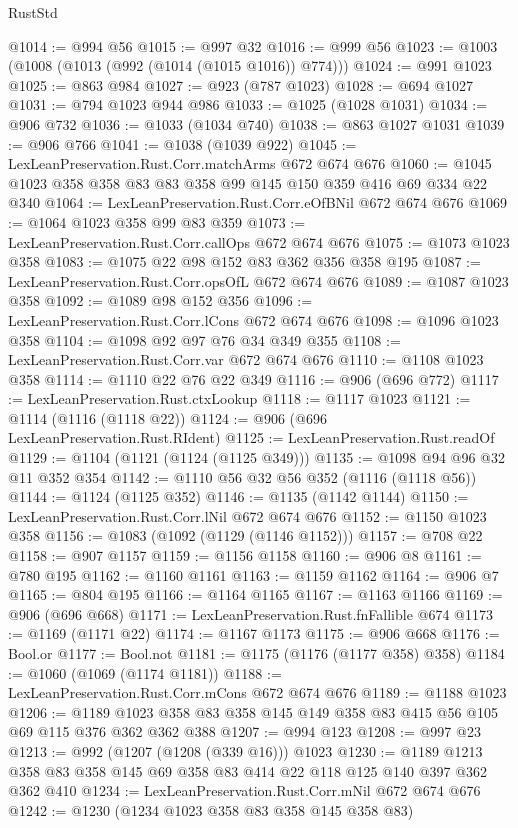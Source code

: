 \begin{lexlean}{RustStd}
\begin{coremodule}
@1014 := @994 @56
@1015 := @997 @32
@1016 := @999 @56
@1023 := @1003 (@1008 (@1013 (@992 (@1014 (@1015 @1016)) @774)))
@1024 := @991 @1023
@1025 := @863 @984
@1027 := @923 (@787 @1023)
@1028 := @694 @1027
@1031 := @794 @1023 @944 @986
@1033 := @1025 (@1028 @1031)
@1034 := @906 @732
@1036 := @1033 (@1034 @740)
@1038 := @863 @1027 @1031
@1039 := @906 @766
@1041 := @1038 (@1039 @922)
@1045 := LexLeanPreservation.Rust.Corr.matchArms @672 @674 @676
@1060 := @1045 @1023 @358 @358 @83 @83 @358 @99 @145 @150 @359 @416 @69 @334 @22 @340
@1064 := LexLeanPreservation.Rust.Corr.eOfBNil @672 @674 @676
@1069 := @1064 @1023 @358 @99 @83 @359
@1073 := LexLeanPreservation.Rust.Corr.callOps @672 @674 @676
@1075 := @1073 @1023 @358
@1083 := @1075 @22 @98 @152 @83 @362 @356 @358 @195
@1087 := LexLeanPreservation.Rust.Corr.opsOfL @672 @674 @676
@1089 := @1087 @1023 @358
@1092 := @1089 @98 @152 @356
@1096 := LexLeanPreservation.Rust.Corr.lCons @672 @674 @676
@1098 := @1096 @1023 @358
@1104 := @1098 @92 @97 @76 @34 @349 @355
@1108 := LexLeanPreservation.Rust.Corr.var @672 @674 @676
@1110 := @1108 @1023 @358
@1114 := @1110 @22 @76 @22 @349
@1116 := @906 (@696 @772)
@1117 := LexLeanPreservation.Rust.ctxLookup
@1118 := @1117 @1023
@1121 := @1114 (@1116 (@1118 @22))
@1124 := @906 (@696 LexLeanPreservation.Rust.RIdent)
@1125 := LexLeanPreservation.Rust.readOf
@1129 := @1104 (@1121 (@1124 (@1125 @349)))
@1135 := @1098 @94 @96 @32 @11 @352 @354
@1142 := @1110 @56 @32 @56 @352 (@1116 (@1118 @56))
@1144 := @1124 (@1125 @352)
@1146 := @1135 (@1142 @1144)
@1150 := LexLeanPreservation.Rust.Corr.lNil @672 @674 @676
@1152 := @1150 @1023 @358
@1156 := @1083 (@1092 (@1129 (@1146 @1152)))
@1157 := @708 @22
@1158 := @907 @1157
@1159 := @1156 @1158
@1160 := @906 @8
@1161 := @780 @195
@1162 := @1160 @1161
@1163 := @1159 @1162
@1164 := @906 @7
@1165 := @804 @195
@1166 := @1164 @1165
@1167 := @1163 @1166
@1169 := @906 (@696 @668)
@1171 := LexLeanPreservation.Rust.fnFallible @674
@1173 := @1169 (@1171 @22)
@1174 := @1167 @1173
@1175 := @906 @668
@1176 := Bool.or
@1177 := Bool.not
@1181 := @1175 (@1176 (@1177 @358) @358)
@1184 := @1060 (@1069 (@1174 @1181))
@1188 := LexLeanPreservation.Rust.Corr.mCons @672 @674 @676
@1189 := @1188 @1023
@1206 := @1189 @1023 @358 @83 @358 @145 @149 @358 @83 @415 @56 @105 @69 @115 @376 @362 @362 @388
@1207 := @994 @123
@1208 := @997 @23
@1213 := @992 (@1207 (@1208 (@339 @16))) @1023
@1230 := @1189 @1213 @358 @83 @358 @145 @69 @358 @83 @414 @22 @118 @125 @140 @397 @362 @362 @410
@1234 := LexLeanPreservation.Rust.Corr.mNil @672 @674 @676
@1242 := @1230 (@1234 @1023 @358 @83 @358 @145 @358 @83)

\end{coremodule}
\end{lexlean}
